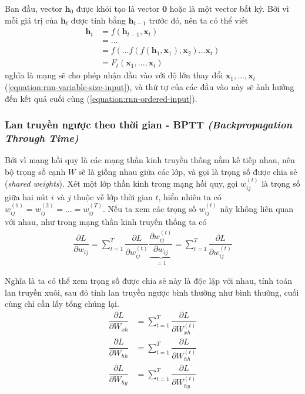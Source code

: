 Ban đầu, vector $\mathbf h_0$ được khỏi tạo là vector $\mathbf 0$ hoặc là một vector bất kỳ. Bởi vì mỗi giá trị của $\mathbf h_t$ được tính bằng $\mathbf h_{t-1}$ trước đó, nên ta có thể viết
\begin{align}
    \mathbf h_t & =f(\mathbf h_{t-1},\mathbf x_t)\nonumber                                                              \\
                & =\dots\nonumber                                                                                      \\
                & =f(\dots f(f(\mathbf h_1,\mathbf x_1),\mathbf x_2)\dots\mathbf x_t)\label{equation:rnn-ordered-input} \\
                & =F_t(\mathbf x_1,\dots,\mathbf x_t)\label{equation:rnn-variable-size-input}
\end{align}
nghĩa là mạng sẽ cho phép nhận đầu vào với độ lớn thay đổi $\mathbf x_1,\dots,\mathbf x_t$ (\ref{equation:rnn-variable-size-input}), và thứ tự của các đầu vào này sẽ ảnh hưởng đến kết quả cuối cùng (\ref{equation:rnn-ordered-input}).

\subsubsection{Lan truyền ngược theo thời gian - BPTT \textit{(Backpropagation Through Time)}}
Bởi vì mạng hồi quy là các mạng thần kinh truyền thống nằm kế tiếp nhau, nên bộ trọng số cạnh $W$ sẽ là giống nhau giữa các lớp, và gọi là trọng số được chia sẻ (\textit{shared weights}). Xét một lớp thần kinh trong mạng hồi quy, gọi $w^{(t)}_{ij}$ là trọng số giữa hai nút $i$ và $j$ thuộc về lớp thời gian $t$, hiển nhiên ta có $w^{(1)}_{ij}=w^{(2)}_{ij}=\dots=w^{(T)}_{ij}$. Nếu ta xem các trọng số $w^{(t)}_{ij}$ này không liên quan với nhau, như trong mạng thần kinh truyến thống ta có
\begin{align}
    \dfrac{\partial L}{\partial w_{ij}}=\sum_{t=1}^T\dfrac{\partial L}{\partial w^{(t)}_{ij}}\underbrace{\dfrac{\partial w^{(t)}_{ij}}{\partial w_{ij}}}_{=1}=\sum_{t=1}^T\dfrac{\partial L}{\partial w^{(t)}_{ij}}
\end{align}

Nghĩa là ta có thể xem trọng số được chia sẻ này là độc lập với nhau, tính toán lan truyền xuôi, sau đó tính lan truyền ngược bình thường như bình thường, cuối cùng chỉ cần lấy tổng chúng lại.
\begin{align}
    \dfrac{\partial L}{\partial W_{xh}} & =\sum_{t=1}^T\dfrac{\partial L}{\partial W_{xh}^{(t)}} \\
    \dfrac{\partial L}{\partial W_{hh}} & =\sum_{t=1}^T\dfrac{\partial L}{\partial W_{hh}^{(t)}} \\
    \dfrac{\partial L}{\partial W_{hy}} & =\sum_{t=1}^T\dfrac{\partial L}{\partial W_{hy}^{(t)}}
\end{align}

